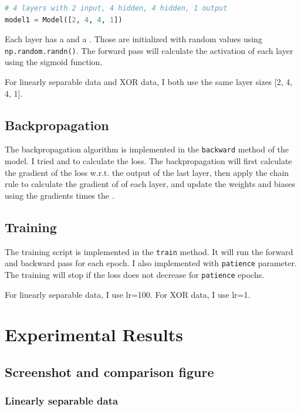 \documentclass{homework}
\begin{document}
\begin{lstlisting}[language=Python]
# 4 layers with 2 input, 4 hidden, 4 hidden, 1 output
model1 = Model([2, 4, 4, 1])
\end{lstlisting}

Each layer has a  and a . Those are initialized with random values using \lstinline{np.random.randn()}. The forward pass will calculate the activation of each layer using the sigmoid function.

For linearly separable data and XOR data, I both use the same layer sizes [2, 4, 4, 1].

\subsection{Backpropagation}

The backpropagation algorithm is implemented in the \lstinline{backward} method of the model. I tried  and  to calculate the loss. The backpropagation will first calculate the gradient of the loss w.r.t. the output of the last layer, then apply the chain rule to calculate the gradient of  of each layer, and update the weights and biases using the gradients times the .

\subsection{Training}

The training script is implemented in the \lstinline{train} method. It will run the forward and backward pass for each epoch. I also implemented  with \lstinline{patience} parameter. The training will stop if the loss does not decrease for \lstinline{patience} epochs.

For linearly separable data, I use lr=100. For XOR data, I use lr=1.

\section{Experimental Results}

\subsection{Screenshot and comparison figure}

\subsubsection{Linearly separable data}
\end{document}
